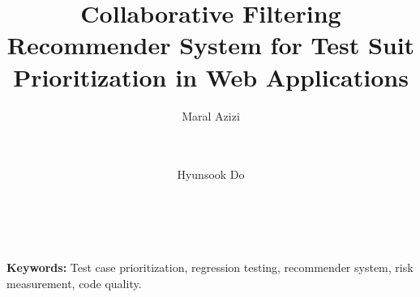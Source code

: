 \documentclass{sig-alternate-05-2015}
\begin{document}


\pagestyle{plain}

 \title{Collaborative Filtering Recommender System for
Test Suit Prioritization in Web Applications  }


\author{
	\alignauthor Maral Azizi\\
	\\
	\\
	\and  %
	\alignauthor Hyunsook Do\\
	\\
	\\
}


\maketitle
\thispagestyle{empty}




\textbf{Keywords: }{Test case prioritization, regression testing, 
recommender system, risk measurement, code quality.}

%












\end{document}
